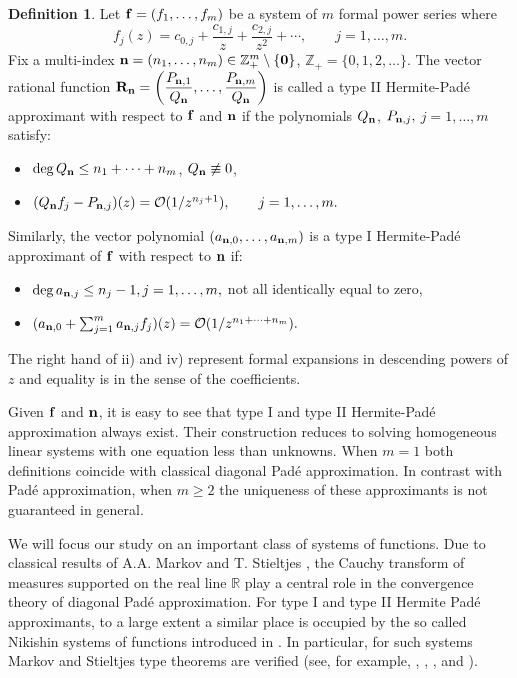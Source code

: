 \documentclass[10pt,a4paper]{article}
\theoremstyle{definition}
\newtheorem{definition}[theorem]{Definition}
\theoremstyle{remark}
\numberwithin{equation}{section}
\begin{document}
\begin{definition}
Let ${\bf f}=(f_1,\ldots,f_m)$ be a system of $m$ formal power series where
\begin{equation}\label{series}
f_j(z)= c_{0,j} + \frac{c_{1,j}}{z}+\frac{c_{2,j}}{z^2}+\cdots, \qquad j=1,\ldots,m.
\end{equation}
Fix a multi-index ${\bf n}=(n_1,\ldots,n_m)\in {\mathbb{Z}}_+^m \setminus \{{\bf 0}\}$, ${\mathbb{Z}}_+=\{0,1,2,\ldots\}.$  The vector rational function  $\displaystyle {\bf R}_{\bf n}=\left(\frac{P_{{\bf n},1}}{Q_{\bf n}},\ldots,\frac{P_{{\bf n},m}}{Q_{\bf n}}\right)$ is called a type II Hermite-Pad\'e approximant with respect to ${\bf f}$ and ${\bf n}$ if the polynomials $Q_{\bf n}$, $P_{{\bf n},j},$ $j=1,\ldots,m$ satisfy:
\begin{itemize}
\item[i)]  $\deg Q_{\bf n} \leq n_1+\cdots+n_m$, $Q_{\bf n}\not \equiv 0$,
\item[ii)] $
(Q_{\bf n}  f_j -P_{{\bf n},j})(z)=\mathcal{O}(1/z^{n_j+1}),  \qquad j=1,\ldots,m.$
\end{itemize}
Similarly, the vector polynomial $(a_{{\bf n},0},\ldots,a_{{\bf n},m})$ is  a type I Hermite-Pad\'e approximant of $\bf f$ with respect to $\bf n$ if:
\begin{itemize}
\item[iii)] $\deg a_{{\bf n},j} \leq n_j -1, j=1,\ldots,m,$ not all identically equal to zero,
\item[iv)] $(a_{{\bf n},0} + \sum_{j=1}^m a_{{\bf n},j}f_j)(z) = \mathcal{O}(1/z^{n_1+\cdots+n_m}).$
\end{itemize}
The right hand of ii) and iv) represent formal expansions in descending powers of $z$ and equality is in the sense of the coefficients.
\end{definition}

Given $\bf f$ and $\bf n$, it is easy to see that  type I and type II Hermite-Pad\'e approximation always exist. Their construction reduces to solving  homogeneous linear systems  with one equation less  than unknowns.  When $m=1$ both definitions coincide with  classical diagonal Pad\'e approximation. In contrast with Pad\'e approximation, when $m \geq 2$ the uniqueness of these approximants is not guaranteed  in general.

We will focus our study on an important class of systems of functions. Due to classical results of A.A. Markov \cite{Mar} and T. Stieltjes \cite{St}, the Cauchy transform of measures supported on the real line $\mathbb{R}$ play a central role  in the convergence theory of diagonal Pad\'e approximation. For type I and type II Hermite Pad\'e approximants, to a large extent a similar place is occupied by the so called Nikishin systems of functions introduced in \cite{Nik}. In particular, for such systems Markov and Stieltjes type theorems are verified (see, for example, \cite{Bus},  \cite{LF3}, \cite{GRS}, \cite{LS} and \cite{Stahl}).
\end{document}
